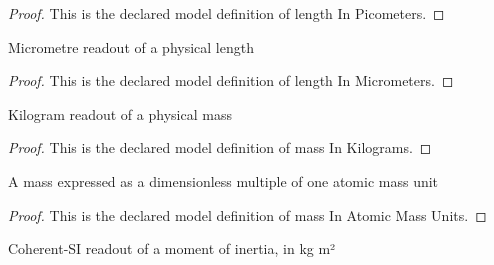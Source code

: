 \begin{proof}
  This is the declared model definition of length In Picometers.
\end{proof}
\begin{definition}
  \label{def:physics:phyx-mini-0631:phyxminiproblems-problemphyxmini0631-lengthinmicrometers}
  Micrometre readout of a physical length
\end{definition}
\begin{proof}
  This is the declared model definition of length In Micrometers.
\end{proof}
\begin{definition}
  \label{def:physics:phyx-mini-0631:phyxminiproblems-problemphyxmini0631-massinkilograms}
  Kilogram readout of a physical mass
\end{definition}
\begin{proof}
  This is the declared model definition of mass In Kilograms.
\end{proof}
\begin{definition}
  \label{def:physics:phyx-mini-0631:phyxminiproblems-problemphyxmini0631-massinatomicmassunits}
  A mass expressed as a dimensionless multiple of one atomic mass unit
\end{definition}
\begin{proof}
  This is the declared model definition of mass In Atomic Mass Units.
\end{proof}
\begin{definition}
  \label{def:physics:phyx-mini-0631:phyxminiproblems-problemphyxmini0631-momentofinertiainkilogrammeterssquared}
  Coherent-SI readout of a moment of inertia, in kg m²
\end{definition}
